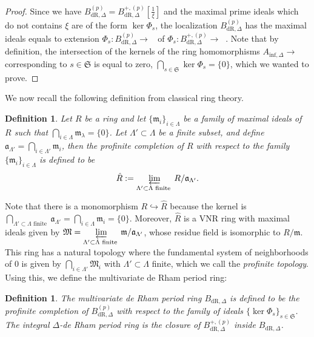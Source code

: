 \documentclass{amsart}
\newtheorem{definition}[proposition]{Definition}
\newcommand{\mAinf}{A_{\mathrm{inf},\Delta}}
\DeclareMathOperator{\Ainf}{A_{inf}}
\DeclareMathOperator{\Bdr}{B_{dR}}
\newcommand{\pmBdrp}{B^{+,(p)}_{\mathrm{dR},\Delta}}
\DeclareMathOperator{\Bdrp}{B^+_{dR}}
\newcommand{\mBdr}{B_{\mathrm{dR},\Delta}}
\newcommand{\pmBdr}{B^{(p)}_{\mathrm{dR},\Delta}}
\begin{document}
\begin{proof}
   Since we have $\pmBdr=\pmBdrp\left[\frac{1}{\xi}\right]$ and the maximal prime ideals which do not contains $\xi$ are of the form $\ker\Phi_s$, the localization $\pmBdr$ has the maximal ideals equals to extension $\Phi_s:\pmBdr\to \Bdr$ of $\Phi_s:\pmBdrp\to\Bdrp$. Note that by definition, the intersection of the kernels of the ring homomorphisms $\mAinf\to\Ainf$ corresponding to $s\in\mathfrak{S}$ is equal to zero, $\bigcap\limits_{s\in\mathfrak{S}}\ker\Phi_s=\{0\}$, which we wanted to prove.
\end{proof}

We now recall the following definition from classical ring theory.

\begin{definition}\label{Profinite completion}
    Let $R$ be a ring and let $\{\mathfrak{m}_i\}_{i\in\Lambda}$ be a family of maximal ideals of $R$ such that $\bigcap\limits_{i\in\Lambda}\mathfrak{m}_\lambda=\{0\}$. Let $\Lambda'\subset\Lambda$ be a finite subset, and define $\mathfrak{a}_{\Lambda'}=\bigcap\limits_{i\in\Lambda'}\mathfrak{m}_i$, then the \emph{profinite completion} of $R$ with respect to the family $\{\mathfrak{m}_i\}_{i\in\Lambda}$ is defined to be
    \begin{align*}
        \hat{R}:=\varprojlim\limits_{\Lambda'\subset\Lambda\text{ finite }}R/\mathfrak{a}_{\Lambda'}.
    \end{align*}
\end{definition}

Note that there is a monomorphism $R\hookrightarrow\hat{R}$ because the kernel is $\bigcap\limits_{\Lambda'\subset\Lambda\text{ finite }}\mathfrak{a}_{\Lambda'}=\bigcap\limits_{i\in\Lambda}\mathfrak{m}_i=\{0\}$. Moreover, $\hat{R}$ is a VNR ring with maximal ideals given by $\mathfrak{M}=\varprojlim\limits_{\Lambda'\subset\Lambda\text{ finite }}\mathfrak{m}/\mathfrak{a}_{\Lambda'}$, whose residue field is isomorphic to $R/\mathfrak{m}$. This ring has a natural topology where the fundamental system of neighborhoods of 0 is given by $\bigcap\limits_{i\in\Lambda'}\mathfrak{M}_i$ with $\Lambda'\subset\Lambda$ finite, which we call the \emph{profinite topology}.\\

Using this, we define the multivariate de Rham period ring:

\begin{definition}
    The \emph{multivariate de Rham period ring} $\mBdr$ is defined to be the profinite completion of $\pmBdr$ with respect to the family of ideals $\{\ker\Phi_s\}_{s\in\mathfrak{S}}$. The \emph{integral $\Delta$-de Rham period ring} is the closure of $\pmBdrp$ inside $\mBdr$.
\end{definition}
\end{document}
